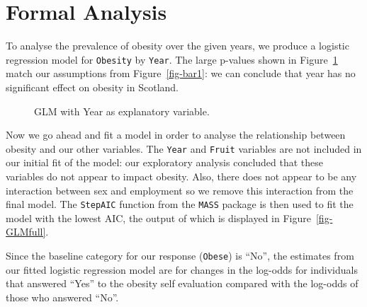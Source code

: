 \documentclass[
  letterpaper,
  DIV=11,
  numbers=noendperiod]{scrartcl}
\begin{document}
\section{Formal Analysis}\label{sec-formalanalysis}

To analyse the prevalence of obesity over the given years, we produce a
logistic regression model for \texttt{Obesity} by \texttt{Year}. The
large p-values shown in Figure~\ref{fig-GLMyear} match our assumptions
from Figure~\ref{fig-bar1}: we can conclude that year has no significant
effect on obesity in Scotland.

\begin{figure}


\caption{\label{fig-GLMyear}GLM with Year as explanatory variable.}

\end{figure}%

Now we go ahead and fit a model in order to analyse the relationship
between obesity and our other variables. The \texttt{Year} and
\texttt{Fruit} variables are not included in our initial fit of the
model: our exploratory analysis concluded that these variables do not
appear to impact obesity. Also, there does not appear to be any
interaction between sex and employment so we remove this interaction
from the final model. The \texttt{StepAIC} function from the
\texttt{MASS} package is then used to fit the model with the lowest AIC,
the output of which is displayed in Figure~\ref{fig-GLMfull}.

Since the baseline category for our response (\texttt{Obese}) is ``No'',
the estimates from our fitted logistic regression model are for changes
in the log-odds for individuals that answered ``Yes'' to the obesity
self evaluation compared with the log-odds of those who answered ``No''.
\end{document}

